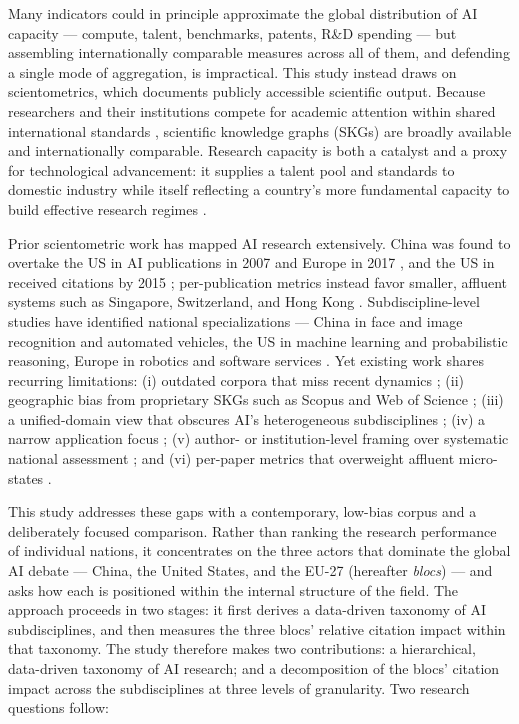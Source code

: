 \documentclass{article}
\let\cite\parencite
\begin{document}
	Many indicators could in principle approximate the global distribution of AI capacity --- compute, talent, benchmarks, patents, R\&D spending \cite{ozkaya2023analysis} --- but assembling internationally comparable measures across all of them, and defending a single mode of aggregation, is impractical. This study instead draws on scientometrics, which documents publicly accessible scientific output. Because researchers and their institutions compete for academic attention within shared international standards \cite{machacek2021globalization}, scientific knowledge graphs (SKGs) are broadly available and internationally comparable. Research capacity is both a catalyst and a proxy for technological advancement: it supplies a talent pool and standards to domestic industry \cite{brekke2021university} while itself reflecting a country's more fundamental capacity to build effective research regimes \cite{szczygielski2024mutual}.
	
	Prior scientometric work has mapped AI research extensively. China was found to overtake the US in AI publications in 2007 \cite{almarzouqi2024comparative} and Europe in 2017 \cite{hellwig2019ai}, and the US in received citations by 2015 \cite{almarzouqi2024comparative}; per-publication metrics instead favor smaller, affluent systems such as Singapore, Switzerland, and Hong Kong \cite{almarzouqi2024comparative}. Subdiscipline-level studies have identified national specializations --- China in face and image recognition and automated vehicles, the US in machine learning and probabilistic reasoning, Europe in robotics and software services \cite{righi2020ai, yu2023discovering}. Yet existing work shares recurring limitations: (i) outdated corpora that miss recent dynamics \cite{niu2016global}; (ii) geographic bias from proprietary SKGs such as Scopus and Web of Science \cite{almarzouqi2024comparative, ozkaya2023analysis, hellwig2019ai}; (iii) a unified-domain view that obscures AI's heterogeneous subdisciplines \cite{almarzouqi2024comparative, cao2020international, alshebli2022beijing}; (iv) a narrow application focus \cite{schmallenbach2024global, mariani2023artificial}; (v) author- or institution-level framing over systematic national assessment \cite{niu2016global, klinger2020narrowing}; and (vi) per-paper metrics that overweight affluent micro-states \cite{righi2020ai}.
	
	This study addresses these gaps with a contemporary, low-bias corpus and a deliberately focused comparison. Rather than ranking the research performance of individual nations, it concentrates on the three actors that dominate the global AI debate --- China, the United States, and the EU-27 (hereafter \textit{blocs}) --- and asks how each is positioned within the internal structure of the field. The approach proceeds in two stages: it first derives a data-driven taxonomy of AI subdisciplines, and then measures the three blocs' relative citation impact within that taxonomy. The study therefore makes two contributions: a hierarchical, data-driven taxonomy of AI research; and a decomposition of the blocs' citation impact across the subdisciplines at three levels of granularity. Two research questions follow:
	
\end{document}
